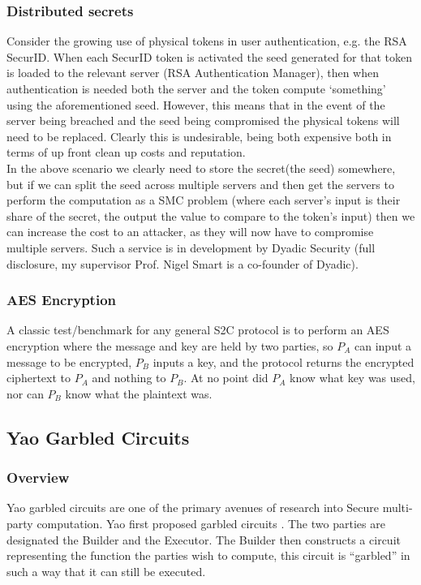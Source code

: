\documentclass[a4paper,10pt]{article}
\begin{document}
			\subsubsection{Distributed secrets} \label{DistributedSecretApplication}
				Consider the growing use of physical tokens in user authentication, e.g. the RSA SecurID. When each SecurID token is activated the seed generated for that token is loaded to the relevant server (RSA Authentication Manager), then when authentication is needed both the server and the token compute `something' using the aforementioned seed. However, this means that in the event of the server being breached and the seed being compromised the physical tokens will need to be replaced. Clearly this is undesirable, being both expensive both in terms of up front clean up costs and reputation.\\

				In the above scenario we clearly need to store the secret(the seed) somewhere, but if we can split the seed across multiple servers and then get the servers to perform the computation as a SMC problem (where each server's input is their share of the secret, the output the value to compare to the token's input) then we can increase the cost to an attacker, as they will now have to compromise multiple servers. Such a service is in development by Dyadic Security (full disclosure, my supervisor Prof. Nigel Smart is a co-founder of Dyadic).

			\subsubsection{AES Encryption} \label{AES_Application}
				A classic test/benchmark for any general S2C protocol is to perform an AES encryption where the message and key are held by two parties, so $P_A$ can input a message to be encrypted, $P_B$ inputs a key, and the protocol returns the encrypted ciphertext to $P_A$ and nothing to $P_B$. At no point did $P_A$ know what key was used, nor can $P_B$ know what the plaintext was.


		\subsection{Yao Garbled Circuits} \label{Yao_Circuits}

			\subsubsection{Overview} \label{Yao_Overview}
				Yao garbled circuits are one of the primary avenues of research into Secure multi-party computation. Yao first proposed garbled circuits \cite{YaoOriginal}. The two parties are designated the Builder and the Executor. The Builder then constructs a circuit representing the function the parties wish to compute, this circuit is ``garbled'' in such a way that it can still be executed.\\
\end{document}
